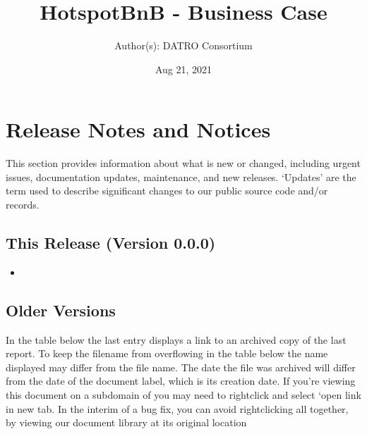 \documentclass[letterpaper,10pt,openany,oneside,english]{sphinxmanual}
\title{HotspotBnB - Business Case}
\date{Aug 21, 2021}
\author{Author(s): DATRO Consortium}
\begin{document}
\pagestyle{empty}
\sphinxmaketitle
\pagestyle{plain}
\sphinxtableofcontents
\pagestyle{normal}
\label{\detokenize{index::doc}}



\chapter{Release Notes and Notices}
\label{\detokenize{releasenotes:release-notes-and-notices}}\label{\detokenize{releasenotes::doc}}
\sphinxAtStartPar
This section provides information about what is new or changed, including urgent issues, documentation updates, maintenance, and new releases.
\sphinxhyphen{} ‘Updates’ are the term used to describe significant changes to our public source code and/or records.


\section{This Release (Version 0.0.0)}
\label{\detokenize{releasenotes:this-release-version-0-0-0}}\begin{itemize}
\item {} 
\sphinxAtStartPar
{} \sphinxhyphen{} 

\end{itemize}


\section{Older Versions}
\label{\detokenize{releasenotes:older-versions}}
\sphinxAtStartPar
In the table below the last entry displays a link to an archived copy of the last report.
To keep the filename from overflowing in the table below the name displayed may differ from the file name.
The date the file was archived will differ from the date of the document label, which is its creation date.
If you’re viewing this document on a subdomain of  you may need to right\sphinxhyphen{}click and select ‘open link in new tab\textasciigrave{}.
In the interim of a bug fix, you can avoid right\sphinxhyphen{}clicking all together, by viewing our document library at its original location 
\end{document}
